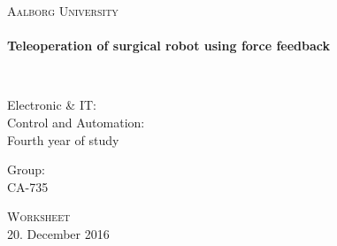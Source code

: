%


\begin{center}

\vspace*{\fill}

\textsc{\LARGE Aalborg University}\\[1.0cm]

\HRule \\[0.4cm]
{ \HUGE \bfseries  Teleoperation of surgical robot using force feedback \\[0.5cm] }

\HRule \\[1.5cm]%


\begin{minipage}{0.4\textwidth}
\begin{flushleft} \large
Electronic \& IT:\\
Control and Automation:\\
Fourth year of study
\end{flushleft}
\end{minipage}
\begin{minipage}{0.4\textwidth}
\begin{flushright} \large
Group: \\
CA-735
\end{flushright}
\end{minipage}

\vspace*{\fill}

\textsc{\Large Worksheet}\\[1.0cm]

{\large 20. December 2016}

\end{center}
\newpage